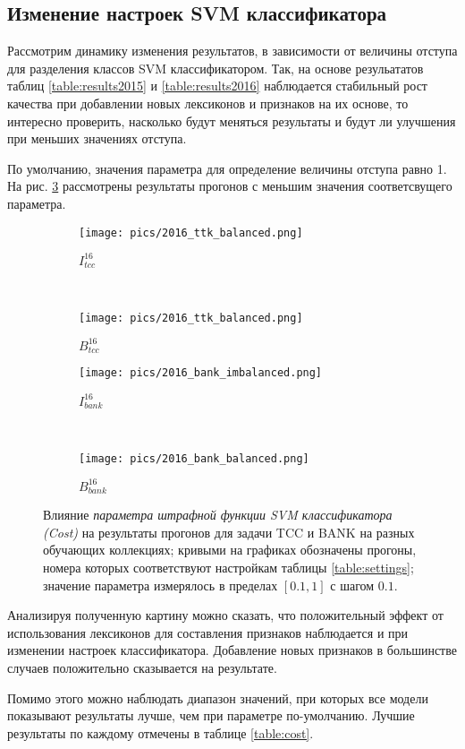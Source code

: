 \subsection{Изменение настроек SVM классификатора}
Рассмотрим динамику изменения результатов, в зависимости от величины
отступа для разделения классов SVM классификатором.
Так, на основе резульататов таблиц \ref{table:results2015} и \ref{table:results2016}
наблюдается стабильный рост качества при добавлении новых лексиконов и признаков
на их основе, то интересно проверить, насколько будут меняться результаты и
будут ли улучшения при меньших значениях отступа.

По умолчанию, значения параметра для определение величины отступа равно 1.
На рис. \ref{fig:cost} рассмотрены результаты прогонов с меньшим значения
соответсвущего параметра.
\begin{figure}[!htop] \centering
    \begin{subfigure}[b]{0.34\textwidth}
        \texttt{[image: pics/2016\_ttk\_balanced.png]}
        \caption{$I_{tcc}^{16}$}
        \label{fig:tcc_cost_changes_2015}
    \end{subfigure}
    ~
    \begin{subfigure}[b]{0.34\textwidth}
        \texttt{[image: pics/2016\_ttk\_balanced.png]}
        \caption{$B_{tcc}^{16}$}
        \label{fig:tcc_cost_changes_2016}
    \end{subfigure}

    \begin{subfigure}[b]{0.46\textwidth}
        \texttt{[image: pics/2016\_bank\_imbalanced.png]}
        \caption{$I_{bank}^{16}$}
    \end{subfigure}
    ~
    \begin{subfigure}[b]{0.46\textwidth}
        \texttt{[image: pics/2016\_bank\_balanced.png]}
        \caption{$B_{bank}^{16}$}
    \end{subfigure}

    \caption{
        Влияние {\it параметра штрафной функции SVM классификатора (Cost)}
        на результаты прогонов для задачи TCC и BANK на разных обучающих
        коллекциях;
        кривыми на графиках обозначены прогоны, номера которых соответствуют
        настройкам таблицы \ref{table:settings};
        значение параметра измерялось в пределах $[0.1, 1]$ с шагом $0.1$.
    }
    \label{fig:cost}
\end{figure}

Анализируя полученную картину можно сказать, что положительный эффект от
использования лексиконов для составления признаков наблюдается и при
изменении настроек классификатора.
Добавление новых признаков в большинстве случаев положительно сказывается на
результате.

Помимо этого можно наблюдать диапазон значений, при которых все модели
показывают результаты лучше, чем при параметре по-умолчанию.
Лучшие результаты по каждому отмечены в таблице \ref{table:cost}.


